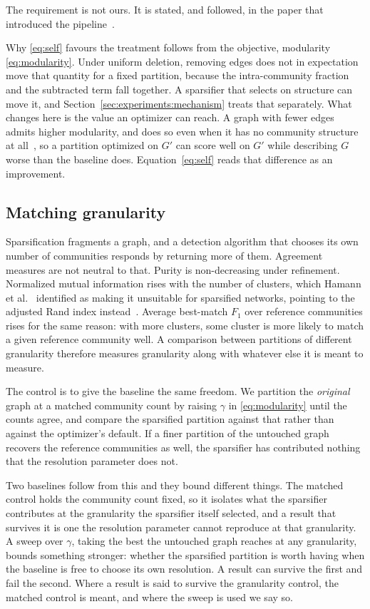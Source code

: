 The requirement is not ours. It is stated, and followed, in the paper that
introduced the pipeline~\cite[\S4.3]{satuluri2011local}.

Why \eqref{eq:self} favours the treatment follows from the objective, modularity
\eqref{eq:modularity}.
Under uniform deletion, removing edges does not in expectation move that quantity
for a fixed partition, because the intra-community fraction and the subtracted
term fall together. A sparsifier that selects on structure can move it, and
Section~\ref{sec:experiments:mechanism} treats that separately. What changes here
is the value an optimizer can reach. A graph with fewer edges admits higher
modularity, and does so even when it has no community structure at
all~\cite{guimera2004modularity}, so a partition optimized on $G'$ can score well
on $G'$ while describing $G$ worse than the baseline does.
Equation~\eqref{eq:self} reads that difference as an improvement.

\subsection{Matching granularity}\label{sec:protocol:granularity}

Sparsification fragments a graph, and a detection algorithm that chooses its own
number of communities responds by returning more of them. Agreement measures are
not neutral to that. Purity is non-decreasing under refinement. Normalized mutual
information rises with the number of clusters, which Hamann et
al.~\cite{hamann2016structure} identified as making it unsuitable for sparsified
networks, pointing to the adjusted Rand index
instead~\cite{vinh2010information}. Average best-match $F_1$ over reference
communities rises for the same reason: with more clusters, some cluster is more
likely to match a given reference community well. A comparison between partitions
of different granularity therefore measures granularity along with whatever else
it is meant to measure.

The control is to give the baseline the same freedom. We partition the
\emph{original} graph at a matched community count by raising $\gamma$ in
\eqref{eq:modularity} until the counts agree, and compare the sparsified
partition against that rather than against the optimizer's default. If a finer
partition of the untouched graph recovers the reference communities as well, the
sparsifier has contributed nothing that the resolution parameter does not.

Two baselines follow from this and they bound different things. The matched
control holds the community count fixed, so it isolates what the sparsifier
contributes at the granularity the sparsifier itself selected, and a result that
survives it is one the resolution parameter cannot reproduce at that granularity.
A sweep over $\gamma$, taking the best the untouched graph reaches at any
granularity, bounds something stronger: whether the sparsified partition is worth
having when the baseline is free to choose its own resolution. A result can
survive the first and fail the second. Where a result is said to survive the
granularity control, the matched control is meant, and where the sweep is used we
say so.

